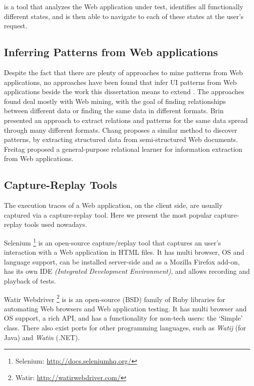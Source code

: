 \cite{dallmeier2012Webmate,dallmeier2013Webmate} is a tool that analyzes the Web application under test, identifies all functionally different states, and is then able to navigate to each of these states at the user’s request.

\subsection{Inferring Patterns from Web applications}
Despite the fact that there are plenty of approaches to mine patterns from Web applications, no approaches have been found that infer UI patterns from Web applications beside the work this dissertation means to extend \cite{nabuco2013inferring, morgado2012gui}. The approaches found deal mostly with Web mining, with the goal of finding relationships between different data or finding the same data in different formats. Brin \cite{brin1999extracting} presented an approach to extract relations and patterns for the same data spread through many different formats. Chang \cite{chang2003automatic} proposes a similar method to discover patterns, by extracting structured data from semi-structured Web documents. Freitag \cite{freitag1998information} proposed a general-purpose relational learner for information extraction from Web applications.

\subsection{Capture-Replay Tools}
The execution traces of a Web application, on the client side, are usually captured via a capture-replay tool. Here we present the most popular capture-replay tools used nowadays.

Selenium \footnote{Selenium: \url{http://docs.seleniumhq.org/}} is an open-source capture/replay tool that captures an user's interaction with a Web application in HTML files. It has multi browser, OS and language support, can be installed server-side and as a Mozilla Firefox add-on, has its own IDE \textit{(Integrated Development Environment)}, and allows recording and playback of tests.

Watir Webdriver \footnote{Watir: \url{http://watirwebdriver.com/}} is is an open-source (BSD) family of Ruby libraries for automating Web browsers and Web application testing. It has multi browser and OS support, a rich API, and has a functionality for non-tech users: the ‘Simple’ class. There also exist ports for other programming languages, such as \textit{Watij} (for Java) and \textit{Watin} (.NET).

